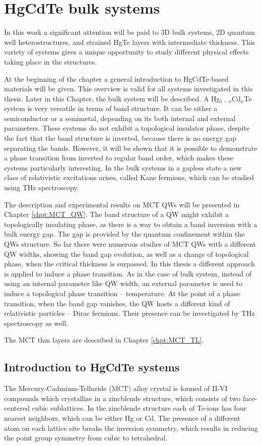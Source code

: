 \documentclass[titlepage,a4paper]{book}
\newcommand{\wciecie}{\quad\phantom{v}}
\begin{document}
\chapter{HgCdTe bulk systems}
\label{chpt:HgCdTe bulk systems}
\wciecie
In this work a significant attention will be paid to 3D bulk systems, 2D quantum well heterostructures, and strained HgTe layers with intermediate thickness. This variety of systems gives a unique opportunity to study different physical effects taking place in the structures. 

At the beginning of the chapter a general introduction to HgCdTe-based materials will be given. This overview is valid for all systems investigated in this thesis. Later in this Chapter, the bulk system will be described. A Hg$_{1-x}$Cd$_x$Te system is very versatile in terms of band structure. It can be either a semiconductor or a semimetal, depending on its both internal and external parameters. These systems do not exhibit a topological insulator phase, despite the fact that the band structure is inverted, because there is no energy gap separating the bands. However, it will be shown that it is possible to demonstrate a phase transition from inverted to regular band order, which makes these systems particularly interesting. In the bulk systems in a gapless state a new class of relativistic excitations arises, called Kane fermions, which can be studied using THz spectroscopy.

The description and experimental results on MCT QWs will be presented in Chapter \ref{chpt:MCT_QW}. The band structure of a QW might exhibit a topologically insulating phase, as there is a way to obtain a band inversion with a bulk energy gap. The gap is provided by the quantum confinement within the QWs structure. So far there were numerous studies of MCT QWs with a different QW widths, showing the band gap evolution, as well as a change of topological phase, when the critical thickness is surpassed. In this thesis a different approach is applied to induce a phase transition. As in the case of bulk system, instead of using an internal parameter like QW width, an external parameter is used to induce a topological phase transition -- temperature. At the point of a phase transition, when the band gap vanishes, the QW hosts a different kind of relativistic particles -- Dirac fermions. Their presence can be investigated by THz spectroscopy as well. 

The MCT thin layers are described in Chapter \ref{chpt:MCT_TL}.  

\section{Introduction to HgCdTe systems}
\wciecie
The Mercury-Cadmium-Telluride (MCT) alloy crystal is formed of II-VI compounds which crystallize in a zincblende structure, which consists of two face-centered cubic sublattices. In the zincblende structure each of Te-ions has four nearest neighbors, which can be either Hg or Cd. The presence of a different atom on each lattice site breaks the inversion symmetry, which results in reducing the point group symmetry from cubic to tetrahedral. 
\end{document}
